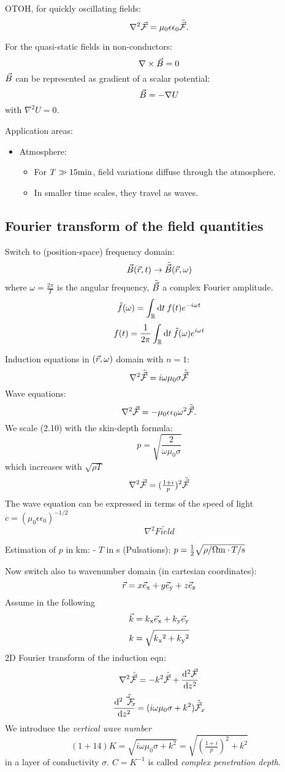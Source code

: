 OTOH, for quickly oscillating fields: \setcounter{equation}{7}\[
  \nabla^2\vec{\mathcal{F}} = \mu_0\epsilon\epsilon_0\ddot{\vec{\mathcal{F}}}.
\]

For the quasi-static fields in non-conductors: \[
  \nabla\times\vec{B} = 0
\] \(\vec{B}\) can be represented as gradient of a scalar potential: \[
  \vec{B} = -\nabla U
\] with \(\nabla^2 U = 0\).

Application areas:

\begin{itemize}
\tightlist
\item
  Atmosphere:

  \begin{itemize}
  \tightlist
  \item
    For \(T\gg15\mathrm{min}\), field variations diffuse through the
    atmosphere.
  \item
    In smaller time scales, they travel as waves.
  \end{itemize}
\end{itemize}

\subsection{Fourier transform of the field
quantities}\label{fourier-transform-of-the-field-quantities}

Switch to (position-space) frequency domain: \[
  \vec{B}(\vec{r},t) \to \tilde{\vec{B}}(\vec{r}, \omega)
\] where \(\omega=\frac{2\pi}T\) is the angular frequency,
\(\tilde{\vec{B}}\) a complex Fourier amplitude. \[
  \tilde f(\omega) = \int_\mathbb{R}\mathrm{d}{t}\: f(t)e^{-i\omega t}
\] \[
  f(t) = \frac1{2\pi}\int_\mathbb{R}\mathrm{d}{t}\: \tilde f(\omega)e^{i\omega t}
\]

Induction equations in \((\vec{r},\omega)\) domain with \(n=1\): \setcounter{equation}{10}\[
  \nabla^2\tilde{\vec{\mathcal{F}}} = i\omega\mu_0\sigma\tilde{\vec{\mathcal{F}}}
\] Wave equations: \[
  \nabla^2\vec{\mathcal{F}} = -\mu_0\epsilon\epsilon_0\omega^2\tilde{\vec{\mathcal{F}}}.
\] We scale (2.10) with the skin-depth formula: \[
  p = \sqrt{\frac{2}{\omega\mu_0\sigma}}
\] which increases with \(\sqrt{\rho T}\) \[
  \nabla^2\vec{\mathcal{F}} = (\tfrac{1+i}{p})^2\tilde{\vec{\mathcal{F}}}
\] The wave equation can be expressed in terms of the speed of light
\(c = (\mu_0\epsilon\epsilon_0)^{-1/2}\) \[
  \nabla^2\tilde{Field}
\]

Estimation of \(p\) in km: - \(T\) in s (Pulsations):
\(p = \tfrac12\sqrt{\rho/\mathrm{\Omega m} \cdot T/\mathrm{s}}\)

Now switch also to wavenumber domain (in cartesian coordinates): \[
  \vec{r} = x \vec{e}\text{$_{\mathrm{x}}$} + y\vec{e}\text{$_{\mathrm{y}}$} + z\vec{e}\text{$_{\mathrm{z}}$}
\] Assume in the following \[
  \vec{k} = k\text{$_{\mathrm{x}}$}\vec{e}\text{$_{\mathrm{x}}$} + k\text{$_{\mathrm{y}}$}\vec{e}\text{$_{\mathrm{y}}$}
\] \[
  k = \sqrt{k\text{$_{\mathrm{x}}$}^2 + k\text{$_{\mathrm{y}}$}^2}
\] 2D Fourier transform of the induction eqn: \setcounter{equation}{13}\[
  \nabla^2\hat{\vec{\mathcal{F}}} = -k^2 \hat{\vec{\mathcal{F}}} + \frac{\mathrm{d}^2\vec{\mathcal{F}}}{\mathrm{d} z^2}
\] \[
  \frac{\mathrm{d}^2\hat{\vec{\mathcal{F}}_x}}{\mathrm{d} z^2} = (i\omega\mu_0\sigma + k^2)\hat{\vec{\mathcal{F}}}_x
\] We introduce the \emph{vertical wave number} \[(1+14)
  K = \sqrt{i\omega\mu_0\sigma + k^2} = \sqrt{(\tfrac{1+i}{p})^2 + k^2}
\] in a layer of conductivity \(\sigma\). \(C = K^{-1}\) is called
\emph{complex penetration depth}.

